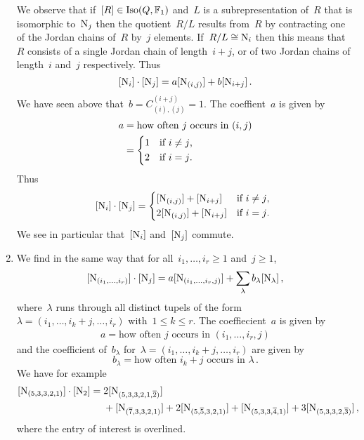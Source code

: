 \documentclass[a4paper,11pt]{scrartcl}
\begin{document}
\begin{example}
\begin{enumerate}
      We observe that if~$[R] \in \operatorname{Iso}(Q, \mathbb{F}_1)$ and~$L$ is a subrepresentation of~$R$ that is isomorphic to~$\mathrm{N}_j$ then the quotient~$R/L$ results from~$R$ by contracting one of the Jordan chains of~$R$ by~$j$ elements.
      If~$R/L \cong \mathrm{N}_i$ then this means that~$R$ consists of a single Jordan chain of length~$i+j$, or of two Jordan chains of length~$i$ and~$j$ respectively.
      Thus
      \[
        [\mathrm{N}_i] \cdot [\mathrm{N}_j]
        =
        a [ \mathrm{N}_{(i,j)} ]
        +
        b [ \mathrm{N}_{i+j} ] \,.
      \]
      We have seen above that~$b = C^{(i+j)}_{(i),(j)} = 1$.
      The coeffient~$a$ is given by
      \begin{align*}
        a
        &=
        \text{how often~$j$ occurs in~$(i,j)$}
        \\
        &=
        \begin{cases*}
          1
          &
          if~$i \neq j$,
          \\
          2
          &
          if~$i = j$.
        \end{cases*}
      \end{align*}
      Thus
      \[
        \class{\Nil_i} \cdot \class{\Nil_j}
        =
        \begin{cases*}
          \class{\Nil_{(i,j)}} + \class{\Nil_{i+j}}
          &
          if~$i \neq j$,
          \\
          2 \class{\Nil_{(i,j)}} + \class{\Nil_{i+j}}
          &
          if~$i = j$.
        \end{cases*}
      \]
      We see in particular that~$[\mathrm{N}_i]$ and~$[\mathrm{N}_j]$ commute.
    \item
      We find in the same way that for all~$i_1, \dotsc, i_r \geq 1$ and~$j \geq 1$,
      \[
        [ \mathrm{N}_{(i_1, \dotsc, i_r)} ] \cdot [ \mathrm{N}_j ]
        =
        a [ \mathrm{N}_{(i_1, \dotsc, i_r, j)} ]
        +
        \sum_{\lambda} b_\lambda [ \mathrm{N}_\lambda ] \,,
      \]
      where~$\lambda$ runs through all distinct tupels of the form~$\lambda = (i_1, \dotsc, i_k + j, \dotsc, i_r)$ with~$1 \leq k \leq r$.
      The coeffiecient~$a$ is given by
      \begin{align*}
        a
        =
        \text{how often~$j$ occurs in~$(i_1, \dotsc, i_r, j)$}
      \end{align*}
      and the coefficient of~$b_\lambda$ for~$\lambda = (i_1, \dotsc, i_k + j, \dotsc, i_r)$ are given by
      \[
        b_\lambda
        =
        \text{how often~$i_k + j$ occurs in~$\lambda$} \,.
      \]
      We have for example
      \begin{align*}
        [ \mathrm{N}_{(5, 3, 3, 2, 1)} ] \cdot [ \mathrm{N}_2 ]
        ={}&
          2 [ \mathrm{N}_{(5, 3, 3, 2, 1, \overline{2})} ]
        \\
        {}&
        +   [ \mathrm{N}_{(\overline{7}, 3, 3, 2, 1)} ]
        + 2 [ \mathrm{N}_{(5, \overline{5}, 3, 2, 1)} ]
        +   [ \mathrm{N}_{(5, 3, 3, \overline{4}, 1)} ]
        + 3 [ \mathrm{N}_{(5, 3, 3, 2, \overline{3})} ] \,,
      \end{align*}
      where the entry of interest is overlined.


\end{enumerate}
\end{example}
\end{document}
